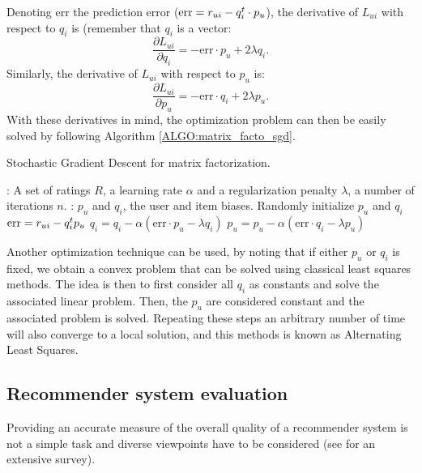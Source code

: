 Denoting err the prediction error ($\text{err} = r_{ui} - q_i^t \cdot p_u$), the
derivative of $L_{ui}$ with respect to $q_i$ is (remember that $q_i$ is a
vector:
$$\frac{\partial L_{ui}}{\partial q_i} = -\text{err} \cdot p_u + 2\lambda
q_i.$$
Similarly, the derivative of $L_{ui}$ with respect to $p_u$ is:
$$\frac{\partial L_{ui}}{\partial p_u} = -\text{err} \cdot q_i + 2\lambda
p_u.$$
With these derivatives in mind, the optimization problem can then be easily
solved by following Algorithm \ref{ALGO:matrix_facto_sgd}.

\begin{algorithm}[!ht]
 \caption{Stochastic Gradient Descent for matrix factorization.}
       \label{ALGO:matrix_facto_sgd}
       \begin{algorithmic}

         : A set of ratings $R$, a learning rate $\alpha$ and
         a regularization penalty $\lambda$, a number of iterations $n$.
         : $p_u$ and $q_i$, the user and item biases.
         \STATE Randomly initialize $p_u$ and $q_i$
         \STATE $\text{err} = r_{ui} - q_i^t p_u$
         \STATE $q_i = q_i - \alpha (\text{err} \cdot p_u - \lambda q_i)$
         \STATE $p_u = p_u - \alpha (\text{err} \cdot q_i - \lambda p_u)$
         \ENDFOR
         \ENDFOR
\end{algorithmic}
\end{algorithm}

Another optimization technique can be used, by noting that if either $p_u$ or
$q_i$ is fixed, we obtain a convex problem that can be solved using
classical least squares methods. The idea is then to first consider all $q_i$
as constants and solve the associated linear problem. Then, the $p_u$ are
considered constant and the associated problem is solved. Repeating these steps
an arbitrary number of time will also converge to a local solution, and this
methods is known as Alternating Least Squares.


\subsection{Recommender system evaluation}
\label{SEC:Recommender_system_evaluation}
Providing an accurate measure of the overall quality of a recommender system is
not a simple task and diverse viewpoints have to be considered (see \cite[Ch.
??]{RecoSystemHandbook} for an extensive survey).

